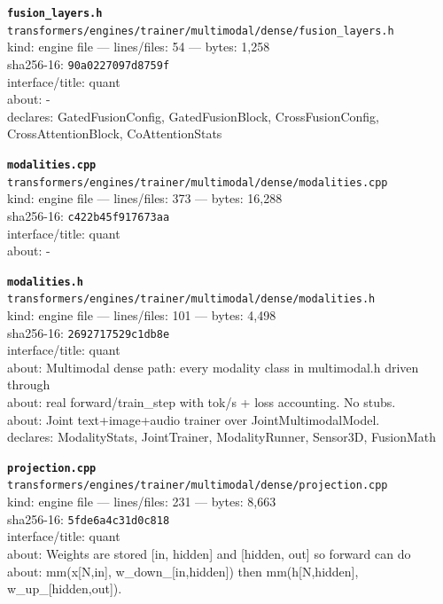 \noindent\textbf{\texttt{fusion\_layers.h}}\\
\texttt{transformers/engines/trainer/multimodal/dense/fusion\_layers.h}\\
kind: engine file --- lines/files: 54 --- bytes: 1,258\\
sha256-16: \texttt{90a0227097d8759f}\\
interface/title: quant\\
about: -\\
declares: GatedFusionConfig, GatedFusionBlock, CrossFusionConfig, CrossAttentionBlock, CoAttentionStats\\
\vspace*{6.0pt}
\newpage

\noindent\textbf{\texttt{modalities.cpp}}\\
\texttt{transformers/engines/trainer/multimodal/dense/modalities.cpp}\\
kind: engine file --- lines/files: 373 --- bytes: 16,288\\
sha256-16: \texttt{c422b45f917673aa}\\
interface/title: quant\\
about: -\\
\vspace*{6.0pt}

\noindent\textbf{\texttt{modalities.h}}\\
\texttt{transformers/engines/trainer/multimodal/dense/modalities.h}\\
kind: engine file --- lines/files: 101 --- bytes: 4,498\\
sha256-16: \texttt{2692717529c1db8e}\\
interface/title: quant\\
about: Multimodal dense path: every modality class in multimodal.h driven through\\
about: real forward/train\_step with tok/s + loss accounting. No stubs.\\
about: Joint text+image+audio trainer over JointMultimodalModel.\\
declares: ModalityStats, JointTrainer, ModalityRunner, Sensor3D, FusionMath\\
\vspace*{6.0pt}

\noindent\textbf{\texttt{projection.cpp}}\\
\texttt{transformers/engines/trainer/multimodal/dense/projection.cpp}\\
kind: engine file --- lines/files: 231 --- bytes: 8,663\\
sha256-16: \texttt{5fde6a4c31d0c818}\\
interface/title: quant\\
about: Weights are stored [in, hidden] and [hidden, out] so forward can do\\
about: mm(x[N,in], w\_down\_[in,hidden]) then mm(h[N,hidden], w\_up\_[hidden,out]).\\
\vspace*{6.0pt}

